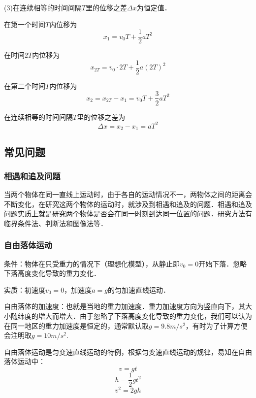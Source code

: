 (3)在连续相等的时间间隔$T$里的位移之差$\Delta x$为恒定值．

在第一个时间$T$内位移为
\begin{equation}
x_1=v_0T+\frac12aT^2
\end{equation}

在时间$2T$内位移为
\begin{equation}
x_{2T}=v_0\cdot2T+\frac12a(2T)^2
\end{equation}

在第二个时间$T$内位移为
\begin{equation}
x_2=x_{2T}-x_1=v_0T+\frac32aT^2
\end{equation}

在连续相等的时间间隔$T$里的位移之差为
\begin{equation}
\Delta x=x_2-x_1=aT^2
\end{equation}

\subsection{常见问题}
\subsubsection{相遇和追及问题}
当两个物体在同一直线上运动时，由于各自的运动情况不一，两物体之间的距离会不断变化，在研究这两个物体的运动时，就涉及到相遇和追及的问题．相遇和追及问题实质上就是研究两个物体是否会在同一时刻到达同一位置的问题．研究方法有临界条件法、判断法和图像法等．

\subsubsection{自由落体运动}
条件：物体在只受重力的情况下（理想化模型），从静止即$v_0=0$开始下落．忽略下落高度变化导致的重力变化．

实质：初速度$v_0=0$，加速度$a=g$的匀加速直线运动．

自由落体的加速度：也就是当地的重力加速度．重力加速度方向为竖直向下，其大小随纬度的增大而增大．由于忽略了下落高度变化导致的重力变化，我们可以认为在同一地区的重力加速度是恒定的，通常默认取$g=9.8m/s^2$，有时为了计算方便会注明取$g=10m/s^2$.

自由落体运动是匀变速直线运动的特例，根据匀变速直线运动的规律，易知在自由落体运动中：
\begin{equation}
v=gt
\end{equation}
\begin{equation}
h=\frac12gt^2
\end{equation}
\begin{equation}
v^2=2gh
\end{equation}

